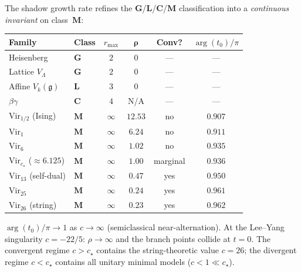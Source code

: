 \begin{remark}
\label{rem:shadow-radius-atlas}
The shadow growth rate refines the
$\mathbf{G}$/$\mathbf{L}$/$\mathbf{C}$/$\mathbf{M}$
classification into a \emph{continuous invariant} on
class~$\mathbf{M}$:
\begin{center}
\renewcommand{\arraystretch}{1.3}
\begin{tabular}{llcccc}
\toprule
\textbf{Family} & \textbf{Class} & $r_{\max}$ &
  $\boldsymbol{\rho}$ & \textbf{Conv?} & \textbf{$\arg(t_0)/\pi$} \\
\midrule
Heisenberg & $\mathbf{G}$ & $2$ & $0$ & --- & --- \\
Lattice $V_\Lambda$ & $\mathbf{G}$ & $2$ & $0$ & --- & --- \\
Affine $V_k(\mathfrak{g})$ & $\mathbf{L}$ & $3$ & $0$ & --- & --- \\
$\beta\gamma$ & $\mathbf{C}$ & $4$ & N/A & --- & --- \\
$\mathrm{Vir}_{1/2}$ (Ising) & $\mathbf{M}$ & $\infty$ &
  $12.53$ & no & $0.907$ \\
$\mathrm{Vir}_1$ & $\mathbf{M}$ & $\infty$ &
  $6.24$ & no & $0.911$ \\
$\mathrm{Vir}_6$ & $\mathbf{M}$ & $\infty$ &
  $1.02$ & no & $0.935$ \\
$\mathrm{Vir}_{c_\star}$ ($\approx 6.125$) & $\mathbf{M}$ &
  $\infty$ & $1.00$ & marginal & $0.936$ \\
$\mathrm{Vir}_{13}$ (self-dual) & $\mathbf{M}$ & $\infty$ &
  $0.47$ & yes & $0.950$ \\
$\mathrm{Vir}_{25}$ & $\mathbf{M}$ & $\infty$ &
  $0.24$ & yes & $0.961$ \\
$\mathrm{Vir}_{26}$ (string) & $\mathbf{M}$ & $\infty$ &
  $0.23$ & yes & $0.962$ \\
\bottomrule
\end{tabular}
\end{center}
\noindent
$\arg(t_0)/\pi \to 1$ as
$c \to \infty$ (semiclassical near-alternation).
At the Lee--Yang singularity $c = -22/5$: $\rho \to \infty$
and the branch points collide at $t = 0$.
The convergent regime $c > c_\star$ contains the
string-theoretic value $c = 26$; the divergent regime
$c < c_\star$ contains all unitary minimal models
($c < 1 \ll c_\star$).


\end{remark}
